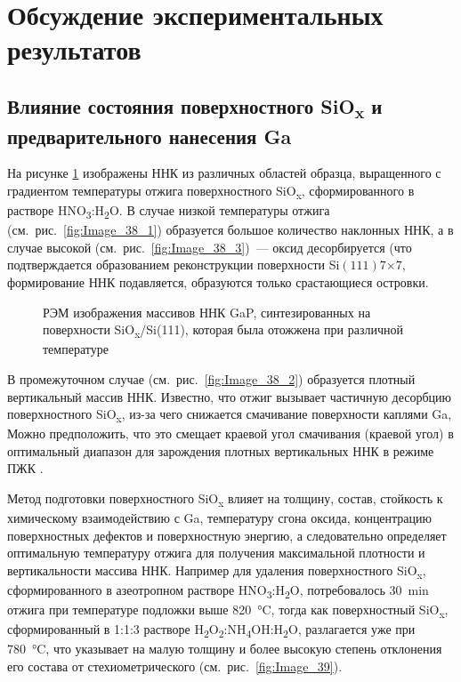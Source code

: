 \section{Обсуждение экспериментальных результатов}\label{sec:ch6/sec2}

\subsection{Влияние состояния поверхностного SiO\textsubscript{x} и
предварительного нанесения Ga}\label{subsec:ch6/sec2/sub1}

На рисунке \cref{fig:Image_38} изображены ННК из различных областей образца,
выращенного с градиентом температуры отжига поверхностного
SiO\textsubscript{x}, сформированного в растворе
HNO\textsubscript{3}:H\textsubscript{2}O. В случае низкой температуры отжига
(см.~рис.~\cref{fig:Image_38_1}) образуется большое количество наклонных ННК, а
в случае высокой (см.~рис.~\cref{fig:Image_38_3})~--- оксид десорбируется (что
подтверждается образованием реконструкции поверхности
Si\((111)7\)\(\times\)\(7\), формирование ННК подавляется, образуются только
срастающиеся островки.

\begin{figure}[ht]  \caption{РЭМ
		изображения массивов ННК GaP, синтезированных на поверхности
		SiO\textsubscript{x}/Si(111), которая была отожжена при различной
температуре}\label{fig:Image_38} \end{figure}

В промежуточном случае (см.~рис.~\cref{fig:Image_38_2}) образуется плотный
вертикальный массив ННК. Известно, что отжиг вызывает частичную десорбцию
поверхностного SiO\textsubscript{x}, из-за чего снижается смачивание
поверхности каплями Ga, Можно предположить, что это смещает краевой угол
смачивания (краевой угол) в оптимальный диапазон для зарождения плотных
вертикальных ННК в режиме ПЖК \cite{Matteini2015}.

Метод подготовки поверхностного SiO\textsubscript{x} влияет на толщину, состав,
стойкость к химическому взаимодействию с Ga, температуру сгона оксида,
концентрацию поверхностных дефектов и поверхностную энергию, а следовательно
определяет оптимальную температуру отжига для получения максимальной плотности
и вертикальности массива ННК. Например для удаления поверхностного
SiO\textsubscript{x}, сформированного в азеотропном растворе
HNO\textsubscript{3}:H\textsubscript{2}O, потребовалось 30~\si{\minute} отжига
при температуре подложки выше 820~\si{\degreeCelsius}, тогда как поверхностный
SiO\textsubscript{x}, сформированный в 1:1:3 растворе
H\textsubscript{2}O\textsubscript{2}:NH\textsubscript{4}OH:H\textsubscript{2}O,
разлагается уже при 780~\si{\degreeCelsius}, что указывает на малую толщину и
более высокую степень отклонения его состава от стехиометрического
(см.~рис.~\cref{fig:Image_39}).

